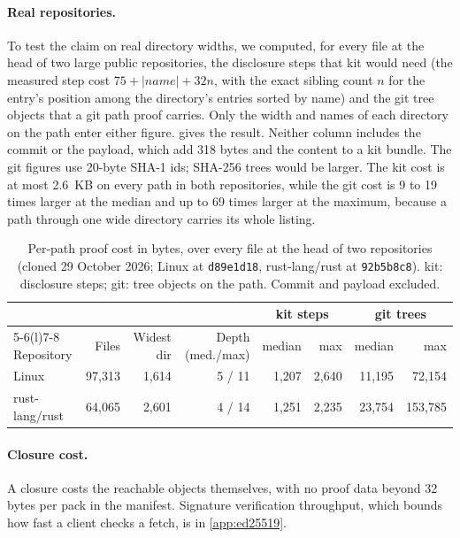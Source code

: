 \documentclass[10pt,letterpaper]{article}
\theoremstyle{remark}
\newcommand{\kit}{\textsf{kit}}
\begin{document}
\paragraph{Real repositories.}
To test the claim on real directory widths, we computed, for every file at the
head of two large public repositories, the disclosure steps that \kit{} would
need (the measured step cost $75 + |\mathit{name}| + 32n$, with the exact
sibling count $n$ for the entry's position among the directory's entries
sorted by name) and the git tree objects that a git path proof carries. Only
the width and names of each directory on the path enter either figure.
 gives the result. Neither column includes the commit or the
payload, which add 318 bytes and the content to a \kit{} bundle. The git
figures use 20-byte SHA-1 ids; SHA-256 trees would be larger. The \kit{} cost
is at most 2.6~KB on every path in both repositories, while the git cost
is 9 to 19 times larger at the median and up to 69 times larger at the
maximum, because a path through one wide directory carries its whole listing.

\begin{table}[!htb]
\centering\footnotesize\setlength{\tabcolsep}{4pt}
\caption{Per-path proof cost in bytes, over every file at the head of two
repositories (cloned 29 October 2026; Linux at \texttt{d89e1d18},
rust-lang/rust at \texttt{92b5b8c8}). \kit{}: disclosure steps; git: tree
objects on the path. Commit and payload excluded.}
\label{tab:real}
\begin{tabular}{@{}lrrrrrrr@{}}
\toprule
& & & & \multicolumn{2}{c}{\kit{} steps} & \multicolumn{2}{c}{git trees} \\
\cmidrule(lr){5-6}\cmidrule(l){7-8}
Repository & Files & Widest dir & Depth (med./max) & median & max & median & max \\
\midrule
Linux        & 97,313 & 1,614 & 5 / 11 & 1,207 & 2,640 & 11,195 & 72,154 \\
rust-lang/rust & 64,065 & 2,601 & 4 / 14 & 1,251 & 2,235 & 23,754 & 153,785 \\
\bottomrule
\end{tabular}
\end{table}

\paragraph{Closure cost.}
A closure costs the reachable objects themselves, with no proof data beyond 32
bytes per pack in the manifest. Signature verification throughput, which
bounds how fast a client checks a fetch, is in \cref{app:ed25519}.
\end{document}
